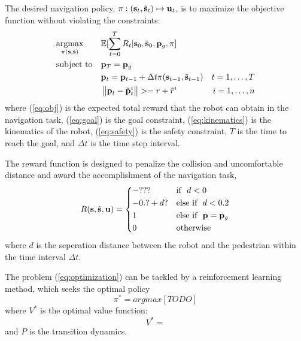 \documentclass[letterpaper, 10 pt, conference]{ieeeconf}  %
\begin{document}
The desired navigation policy, $\pi : (\bold{s}_t, \tilde{\bold{s}}_t) \mapsto \bold{u}_t$, is to maximize the objective function without violating the constraints:
\begin{subequations} \label{eq:optimization}
\begin{align}
& \underset{\pi(\bold{s}, \tilde{\bold{s}})}{\text{argmax}}
& & \mathbb{E}[\sum_{t=0}^T R_t | \bold{s}_0, \tilde{\bold{s}}_0, \bold{p}_g, \pi] \label{eq:obj} \\
& \text{subject to} 
& & \bold{p}_T = \bold{p}_g \label{eq:goal} \\
&&& \bold{p}_t = \bold{p}_{t-1} + \Delta t \pi(\bold{s}_{t-1}, \tilde{\bold{s}}_{t-1}) & t = 1, \dots, T \label{eq:kinematics} \\
&&& \left\Vert \bold{p}_t - \tilde{\bold{p}}_t^i \right\Vert >= r + \tilde{r}^i & i = 1, \dots, n \label{eq:safety}
\end{align}
\end{subequations}
where (\ref{eq:obj}) is the expected total reward that the robot can obtain in the navigation task, (\ref{eq:goal}) is the goal constraint, (\ref{eq:kinematics}) is the kinematics of the robot, (\ref{eq:safety}) is the safety constraint, $T$ is the time to reach the goal, and $\Delta t$ is the time step interval. 

The reward function is designed to penalize the collision and uncomfortable distance and award the accomplishment of the navigation task, 
\begin{equation}
    R(\bold{s},\tilde{\bold{s}},\bold{u})= 
\begin{dcases}
    -??? & \text{if} ~~ d < 0 \\
    -0.? + d? & \text{else if} ~~ d < 0.2 \\
    1 & \text{else if} ~~ \bold{p}=\bold{p}_g \\
    0 & \text{otherwise} 
\end{dcases}
\end{equation}
where $d$ is the seperation distance between the robot and the pedestrian within the time interval $\Delta t$. 

The problem (\ref{eq:optimization}) can be tackled by a reinforcement learning method, which seeks the optimal policy 
\begin{equation}
\pi^{*} = argmax [TODO]
\end{equation}
where $V^{*}$ is the optimal value function: 
\begin{equation}
V^{*} = 
\end{equation}
and $P $ is the transition dynamics. 
\end{document}
